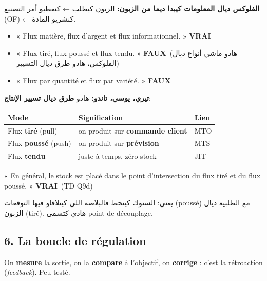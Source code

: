 \documentclass[11pt,a4paper]{article}
\newcommand{\ar}[1]{\textarabic{#1}}
\newcommand{\fr}[1]{\textfrench{#1}}
\newcommand{\vrai}{\textcolor{vert}{\textbf{VRAI}}}
\newcommand{\faux}{\textcolor{rouge}{\textbf{FAUX}}}
\begin{document}
\begin{note}
\par\begin{Arabic}
\textbf{الفلوكس ديال المعلومات كيبدا ديما من الزبون:} الزبون كيطلب ← كنعطيو أمر التصنيع (\fr{OF}) ← كنشريو المادة.
\end{Arabic}
\end{note}

\begin{piege}
\begin{itemize}
\item « Flux matière, flux d'argent et flux informationnel. » \vrai
\item « Flux tiré, flux poussé et flux tendu. » \faux \ \ar{(هادو ماشي أنواع ديال الفلوكس، هادو طرق ديال التسيير)}
\item « Flux par quantité et flux par variété. » \faux
\end{itemize}
\end{piege}

\par\begin{Arabic}
\textbf{تيري، پوسي، تاندو:} هادو \textbf{طرق ديال تسيير الإنتاج}:
\end{Arabic}
\begin{center}
\begin{tabular}{lll}
\toprule
\textbf{Mode} & \textbf{Signification} & \textbf{Lien} \\
\midrule
Flux \textbf{tiré} (pull) & on produit sur \textbf{commande client} & MTO \\
Flux \textbf{poussé} (push) & on produit sur \textbf{prévision} & MTS \\
Flux \textbf{tendu} & juste à temps, zéro stock & JIT \\
\bottomrule
\end{tabular}
\end{center}
\begin{examen}
« En général, le stock est placé dans le point d'intersection du flux tiré et du flux poussé. » \vrai \ (TD Q9d)
\par\begin{Arabic}
يعني: الستوك كيتحط فالبلاصة اللي كيتلاقاو فيها التوقعات (\fr{poussé}) مع الطلبية ديال الزبون (\fr{tiré}). هادي كتسمى \fr{point de découplage}.
\end{Arabic}
\end{examen}

\subsection*{6. La boucle de régulation}
On \textbf{mesure} la sortie, on la \textbf{compare} à l'objectif, on \textbf{corrige} : c'est la rétroaction (\emph{feedback}). Peu testé.
\end{document}
